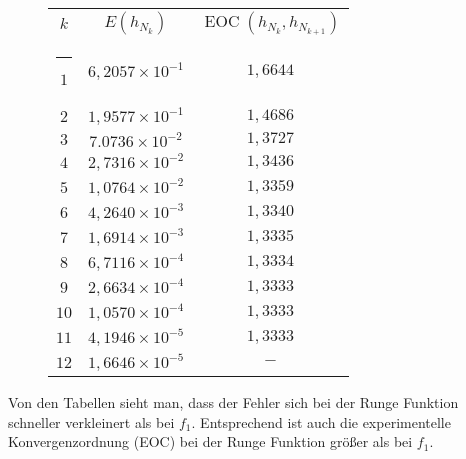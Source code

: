 \documentclass[]{scrartcl}
\makeatletter
\newcommand{\thickhline}{%
    \noalign {\ifnum 0=`}\fi \hrule height 1pt
    \futurelet \reserved@a \@xhline
}
\makeatother
\begin{document}
 	\begin{figure}[H]
		\centering
	 	\begin{tabular}{|c|c|c|}\hline
	 	$k$  & $E(h_{N_k})$ & $\operatorname{EOC}(h_{N_k},h_{N_{k+1}})$\\\thickhline
	 	$1$  & $6,2057\times10^{-1}$ & $1,6644$\\\hline
	 	$2$  & $1,9577\times10^{-1}$ & $1,4686$\\\hline
	 	$3$  & $7.0736\times10^{-2}$ & $1,3727$\\\hline
	 	$4$  & $2,7316\times10^{-2}$ & $1,3436$\\\hline
	 	$5$  & $1,0764\times10^{-2}$ & $1,3359$\\\hline
	 	$6$  & $4,2640\times10^{-3}$ & $1,3340$\\\hline
	 	$7$  & $1,6914\times10^{-3}$ & $1,3335$\\\hline
	 	$8$  & $6,7116\times10^{-4}$ & $1,3334$\\\hline
	 	$9$  & $2,6634\times10^{-4}$ & $1,3333$\\\hline
	 	$10$ & $1,0570\times10^{-4}$ & $1,3333$\\\hline
	 	$11$ & $4,1946\times10^{-5}$ & $1,3333$\\\hline
	 	$12$ & $1,6646\times10^{-5}$ & $-$\\\hline
 		\end{tabular}
 	\end{figure}
 	
 	Von den Tabellen sieht man, dass der Fehler sich bei der Runge Funktion schneller verkleinert als bei $f_1$. Entsprechend ist auch die experimentelle Konvergenzordnung (EOC) bei der Runge Funktion größer als bei $f_1$.
\end{document}
